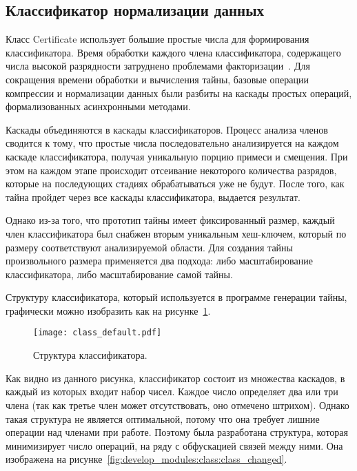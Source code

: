 \subsection{Классификатор нормализации данных}
\label{sub:develop_modules:class}

Класс \foreignlanguage{english}{Certificate} использует большие простые числа для формирования классификатора. Время обработки каждого члена классификатора, содержащего числа высокой разрядности затруднено проблемами факторизации~\cite{facto_number}. Для сокращения времени обработки и вычисления тайны, базовые операции компрессии и нормализации данных были разбиты на каскады простых операций, формализованных асинхронными методами.

Каскады объединяются в каскады классификаторов. Процесс анализа членов сводится к тому, что простые числа последовательно анализируется на каждом каскаде классификатора, получая уникальную порцию примеси и смещения. При этом на каждом этапе происходит отсеивание некоторого количества разрядов, которые на последующих стадиях обрабатываться уже не будут. После того, как тайна пройдет через все каскады классификатора, выдается результат.

Однако из-за того, что прототип тайны имеет фиксированный размер, каждый член классификатора был снабжен вторым уникальным хеш-ключем, который по размеру соответствуют анализируемой области. Для создания тайны произвольного размера применяется два подхода: либо масштабирование классификатора, либо масштабирование самой тайны.

Структуру классификатора, который используется в программе генерации тайны, графически можно изобразить как на рисунке~\ref{fig:develop_modules:class:class_default}.

\begin{figure}[ht]
\centering
  \texttt{[image: class\_default.pdf]}
  \caption{ Структура классификатора. }
  \label{fig:develop_modules:class:class_default}
\end{figure}

Как видно из данного рисунка, классификатор состоит из множества каскадов, в каждый из которых входит набор чисел. Каждое число определяет два или три члена (так как третье член может отсутствовать, оно отмечено штрихом). Однако такая структура не является оптимальной, потому что она требует лишние операции над членами при работе. Поэтому была разработана структура, которая минимизирует число операций, на ряду с обфускацией связей между ними. Она изображена на рисунке~\ref{fig:develop_modules:class:class_changed}.

